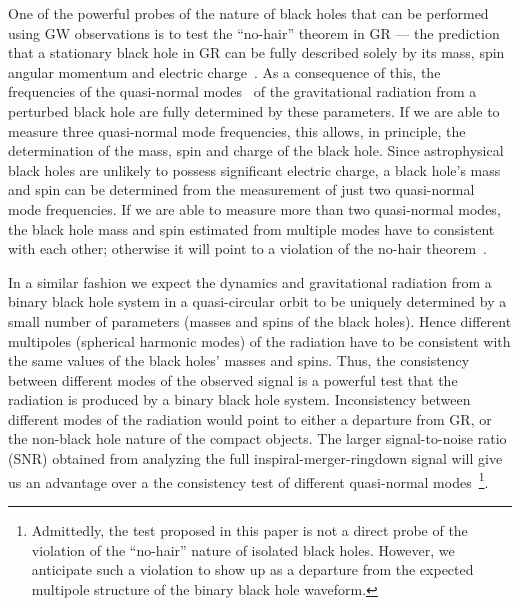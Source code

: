 \documentclass[prd,preprintnumbers,twocolumn,eqsecnum,floatfix,a4paper,nofootinbib,superscriptaddress]{revtex4}
\begin{document}
One of the powerful probes of the nature of black holes that can be performed using GW observations is to test the ``no-hair'' theorem in GR --- the prediction that a stationary black hole in GR can be fully described solely by its mass, spin angular momentum and electric charge~\cite{Israel:1967,Israel:1968,Carter:1978}. As a consequence of this, the frequencies of the {quasi-normal modes}~\cite{Vishveshwara:1970zz,Press:1971wr,Chandrasekhar:1975zza} of the gravitational radiation from a perturbed black hole are fully determined by these parameters. If we are able to measure three quasi-normal mode frequencies, this allows, in principle, the determination of the mass, spin and charge of the black hole. Since astrophysical black holes are unlikely to possess significant electric charge, a black hole's mass and spin can be determined from the measurement of just two quasi-normal mode frequencies. If we are able to measure more than two quasi-normal modes, the black hole mass and spin estimated from multiple modes have to consistent with each other; otherwise it will point to a violation of the no-hair theorem~\cite{Dreyer:2003bv}.

In a similar fashion we expect the dynamics and gravitational radiation from a binary black hole system in a quasi-circular orbit to be uniquely determined by a small number of parameters (masses and spins of the black holes). Hence different multipoles (spherical harmonic modes) of the radiation have to be consistent with the same values of the black holes' masses and spins. Thus, the consistency between different modes of the observed signal is a powerful test that the radiation is produced by a binary black hole system. Inconsistency between different modes of the radiation would point to either a departure from GR, or the non-black hole nature of the compact objects. The larger signal-to-noise ratio (SNR) obtained from analyzing the full inspiral-merger-ringdown signal will give us an advantage over a the consistency test of different quasi-normal modes~\footnote{Admittedly, the test proposed in this paper is not a direct probe of the violation of the ``no-hair'' nature of isolated black holes. However, we anticipate such a violation to show up as a departure from the expected multipole structure of the binary black hole waveform.}. 

\end{document}

